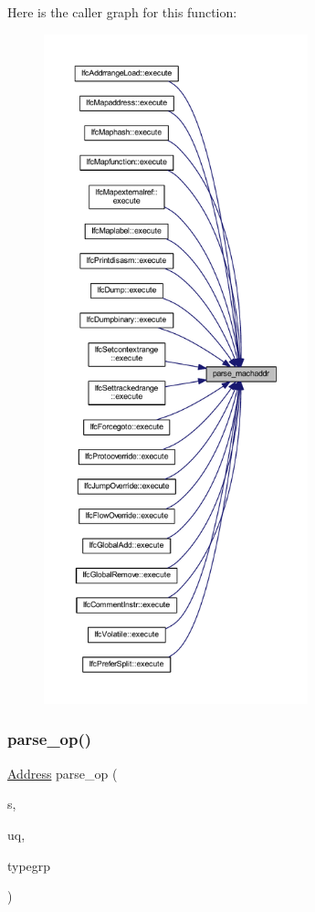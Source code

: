 Here is the caller graph for this function\+:
\nopagebreak
\begin{figure}[H]
\begin{center}
\leavevmode
\includegraphics[height=550pt]{grammar_8hh_a302ab5f0360041b5ca095c6da01fc5ea_icgraph}
\end{center}
\end{figure}
\mbox{\label{grammar_8hh_aeb19e7a1e824350698ccfd193cfb515a}} 
\subsubsection{\texorpdfstring{parse\_op()}{parse\_op()}}
{\footnotesize\ttfamily \mbox{\hyperlink{class_address}{Address}} parse\+\_\+op (\begin{DoxyParamCaption}\item[{istream \&}]{s,  }\item[{uintm \&}]{uq,  }\item[{const \mbox{\hyperlink{class_type_factory}{Type\+Factory}} \&}]{typegrp }\end{DoxyParamCaption})}

